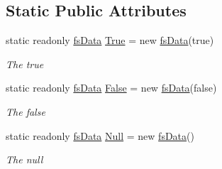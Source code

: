 \subsection*{Static Public Attributes}
\begin{DoxyCompactItemize}
\item 
static readonly \hyperlink{class_full_serializer_1_1fs_data}{fs\+Data} \hyperlink{class_full_serializer_1_1fs_data_af36a1f41bbcf0f17e56b77cc80e0e0b3}{True} = new \hyperlink{class_full_serializer_1_1fs_data}{fs\+Data}(true)
\begin{DoxyCompactList}\small\item\em The true \end{DoxyCompactList}\item 
static readonly \hyperlink{class_full_serializer_1_1fs_data}{fs\+Data} \hyperlink{class_full_serializer_1_1fs_data_a55dbf6381c50c95a042334c119fccdfc}{False} = new \hyperlink{class_full_serializer_1_1fs_data}{fs\+Data}(false)
\begin{DoxyCompactList}\small\item\em The false \end{DoxyCompactList}\item 
static readonly \hyperlink{class_full_serializer_1_1fs_data}{fs\+Data} \hyperlink{class_full_serializer_1_1fs_data_adcb3ce2b86c6f317a74ee3ecfe9c41be}{Null} = new \hyperlink{class_full_serializer_1_1fs_data}{fs\+Data}()
\begin{DoxyCompactList}\small\item\em The null \end{DoxyCompactList}\end{DoxyCompactItemize}
